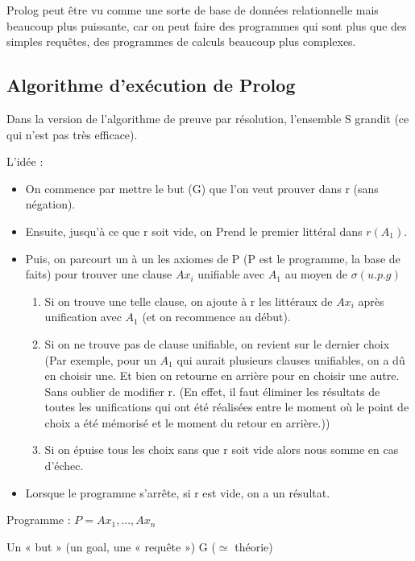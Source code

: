 	 Prolog peut être vu comme une sorte de base de données relationnelle mais beaucoup plus puissante, car on peut faire des programmes qui sont plus que des simples requêtes, des programmes de calculs beaucoup plus complexes.
	 
\subsection{Algorithme d'exécution de Prolog}

Dans la version de l’algorithme de preuve par résolution, l’ensemble S grandit (ce qui n’est pas très efficace).

L’idée :
\begin{itemize}
	\item On commence par mettre le but (G) que l’on veut prouver dans r (sans négation).
	\item Ensuite, jusqu’à ce que r soit vide, on Prend le premier littéral dans $r(A_{1})$.
	\item Puis, on parcourt un à un les axiomes de P (P est le programme, la base de faits) pour trouver une clause $Ax_{i}$ unifiable avec $A_{1}$ au moyen de $\sigma(u.p.g)$
	\begin{enumerate}
		\item Si on trouve une telle clause, on ajoute à r les littéraux de $Ax_{i}$ après unification avec $A_{1}$ (et on recommence au début).
		\item Si on ne trouve pas de clause unifiable, on revient sur le dernier choix (Par exemple, pour un $A_{1}$ qui aurait plusieurs clauses unifiables, on a dû en choisir une. Et bien on retourne en arrière pour en choisir une autre. Sans oublier de modifier r. (En effet, il faut éliminer les résultats de toutes les unifications qui ont été réalisées entre le moment où le point de choix a été mémorisé et le moment du retour en arrière.))
		\item Si on épuise tous les choix sans que r soit vide alors nous somme en cas d’échec.
	\end{enumerate}
	\item Lorsque le programme s’arrête, si r est vide, on a un résultat.
\end{itemize}

Programme  : $P={Ax_{1}, ..., Ax_{n}}$

Un « but » (un goal, une « requête ») G ($\simeq$ théorie)


